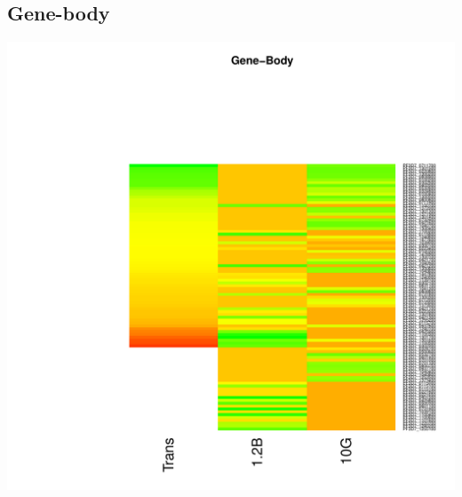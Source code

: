 \documentclass{article}\usepackage[]{graphicx}\usepackage[]{color}
\newenvironment{knitrout}{}{} %
\begin{document}
\subsection{Gene-body}
\begin{knitrout}
\color{fgcolor}

{\centering \includegraphics[width=.9\linewidth]{figure/minimal-heatmap_gene-1} 

}



\end{knitrout}
\clearpage
\end{document}
